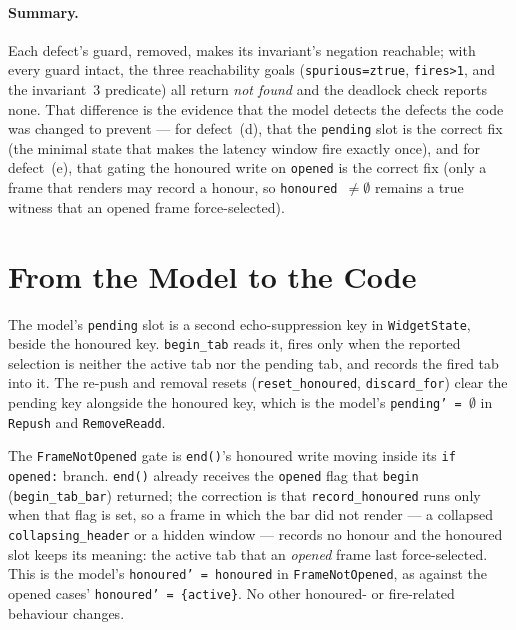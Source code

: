 \documentclass[a4paper,10pt,fleqn]{article}
\begin{document}
\paragraph{Summary.}
Each defect's guard, removed, makes its invariant's negation reachable; with
every guard intact, the three reachability goals (\texttt{spurious=ztrue},
\texttt{fires>1}, and the invariant~3 predicate) all return \emph{not found} and
the deadlock check reports none.  That difference is the evidence that the model
detects the defects the code was changed to prevent --- for defect~(d), that the
\texttt{pending} slot is the correct fix (the minimal state that makes the
latency window fire exactly once), and for defect~(e), that gating the honoured
write on \texttt{opened} is the correct fix (only a frame that renders may record
a honour, so \texttt{honoured $\neq \emptyset$} remains a true witness that an
opened frame force-selected).

\section{From the Model to the Code}

The model's \texttt{pending} slot is a second echo-suppression key in
\texttt{WidgetState}, beside the honoured key.  \texttt{begin\_tab} reads it,
fires only when the reported selection is neither the active tab nor the
pending tab, and records the fired tab into it.  The re-push and removal resets
(\texttt{reset\_honoured}, \texttt{discard\_for}) clear the pending key
alongside the honoured key, which is the model's \texttt{pending' = $\emptyset$}
in \texttt{Repush} and \texttt{RemoveReadd}.

The \texttt{FrameNotOpened} gate is \texttt{end()}'s honoured write moving inside
its \texttt{if opened:} branch.  \texttt{end()} already receives the
\texttt{opened} flag that \texttt{begin} (\texttt{begin\_tab\_bar}) returned; the
correction is that \texttt{record\_honoured} runs only when that flag is set, so
a frame in which the bar did not render --- a collapsed \texttt{collapsing\_header}
or a hidden window --- records no honour and the honoured slot keeps its meaning:
the active tab that an \emph{opened} frame last force-selected.  This is the
model's \texttt{honoured' = honoured} in \texttt{FrameNotOpened}, as against the
opened cases' \texttt{honoured' = \{active\}}.  No other honoured- or
fire-related behaviour changes.
\end{document}
